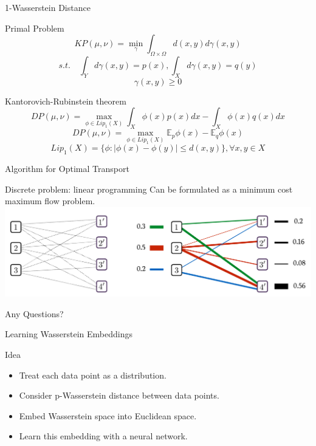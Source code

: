 \documentclass{beamer}
\newcommand{\mb}{\mathbb}
\newcommand{\set}[1]{\{#1\}}
\begin{document}
\begin{frame}{1-Wasserstein Distance}
  \begin{block}{Primal Problem}
    \[KP(\mu, \nu)=\min_{\gamma}\int_{\Omega\times \Omega}d(x,y)d\gamma(x,y)\]
    \[s.t. \quad \int_Y d\gamma(x,y)=p(x), \int_X d\gamma(x,y)=q(y)\]
    \[\gamma(x,y)\geq 0\]
  \end{block}

  \begin{block}{Kantorovich-Rubinstein theorem}
    \[DP(\mu, \nu)=\max_{\phi\in Lip_1(X)}\int_X\phi(x)p(x)dx-\int_X\phi(x)q(x)dx\]
    \[DP(\mu, \nu)=\max_{\phi\in Lip_1(X)}\mb E_p\phi(x)-\mb E_q\phi(x)\]
    \[Lip_1(X)=\set{\phi : |\phi(x)-\phi(y)|\leq d(x,y)}, \forall x,y\in X\]
  \end{block}
\end{frame}


\begin{frame}{Algorithm for Optimal Transport}
  \begin{block}{Discrete problem: linear programming}
    Can be formulated as a minimum cost maximum flow problem.
    \includegraphics[width=\textwidth]{images/flow.png}
  \end{block}
\end{frame}

\begin{frame}{Any Questions?}
\end{frame}

\begin{frame}{Learning Wasserstein Embeddings}
  \begin{block}{Idea}
    \begin{itemize}
    \item Treat each data point as a distribution.
    \item Consider p-Wasserstein distance between data points.
    \item Embed Wasserstein space into Euclidean space.
    \item Learn this embedding with a neural network.
    \end{itemize}
  \end{block}
\end{frame}
\end{document}

